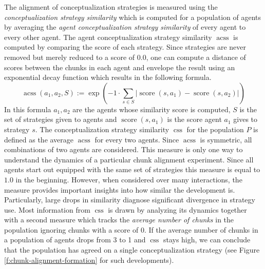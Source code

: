 The alignment of conceptualization strategies is measured using the
\emph{conceptualization strategy similarity} which is computed for a population of agents 
by averaging the \emph{agent conceptualization strategy similarity} of every agent to every other
agent. The agent conceptualization strategy similarity $\operatorname{acss}$ is computed by comparing
the score of each strategy. Since strategies are never removed but merely reduced
to a score of $0.0$, one can compute a distance of scores between the chunks in each agent
and envelope the result using an exponential decay function which results in the following formula.
\begin{equation*}
\operatorname{acss}(a_1,a_2,S):=  \exp \left( -1 \cdot \sum_{s \in S} |\operatorname{score}(s,a_1) - \operatorname{score}(s,a_2)| \right) 
\end{equation*}
In this formula $a_1,a_2$ are the agents whose similarity score is computed, $S$ is the set 
of strategies given
to agents and $\operatorname{score}(s,a_1)$ is the score agent $a_1$ gives to strategy $s$.
The conceptualization strategy similarity $\operatorname{css}$ for the population $P$ is defined 
as the average $\operatorname{acss}$
for every two agents. Since $\operatorname{acss}$ is symmetric, all combinations of two agents are
considered. This measure is only one way to understand the dynamics of a particular chunk alignment 
experiment. Since all agents start out equipped with the same set of strategies this measure is equal to $1.0$
in the beginning. However, when considered over many interactions, the measure provides important insights 
into how similar the development is. Particularly, large drops in similarity diagnose significant divergence in strategy use. Most information from $\operatorname{css}$ is drawn by analyzing its dynamics together with a 
second measure which tracks the \emph{average number of chunks} in the population ignoring chunks with a 
score of $0$. If the average number of chunks in a population of agents drops from 3 to 1 and 
$\operatorname{css}$ stays
high, we can conclude that the population has agreed on a single conceptualization strategy (see Figure
\ref{f:chunk-alignment-formation} for such developments). 

